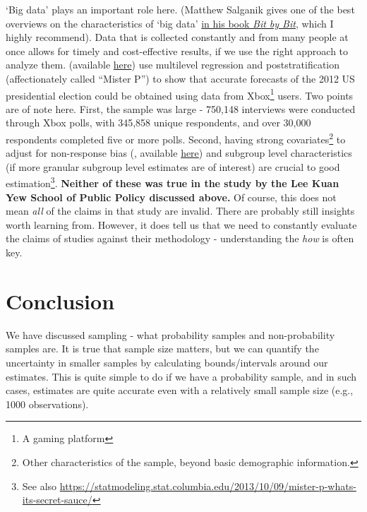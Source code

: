 \documentclass[openany]{book}
\let\rmarkdownfootnote\footnote%
\def\footnote{\protect\rmarkdownfootnote}
\begin{document}
`Big data' plays an important role here. (Matthew Salganik gives one of
the best overviews on the characteristics of `big data'
\href{https://www.bitbybitbook.com/en/1st-ed/observing-behavior/characteristics/}{in
his book \emph{Bit by Bit}}, which I highly recommend). Data that is
collected constantly and from many people at once allows for timely and
cost-effective results, if we use the right approach to analyze them.
\citet{wang_forecasting_2015} (available
\href{http://www.stat.columbia.edu/~gelman/research/published/forecasting-with-nonrepresentative-polls.pdf}{here})
use multilevel regression and poststratification (affectionately called
``Mister P'') to show that accurate forecasts of the 2012 US
presidential election could be obtained using data from Xbox\footnote{A
  gaming platform} users. Two points are of note here. First, the sample
was large - 750,148 interviews were conducted through Xbox polls, with
345,858 unique respondents, and over 30,000 respondents completed five
or more polls. Second, having strong covariates\footnote{Other
  characteristics of the sample, beyond basic demographic information.}
to adjust for non-response bias (\citet{gelman_mythical_2016}, available
\href{http://www.stat.columbia.edu/~gelman/research/published/swingers.pdf}{here})
and subgroup level characteristics (if more granular subgroup level
estimates are of interest) are crucial to good estimation\footnote{See
  also
  \url{https://statmodeling.stat.columbia.edu/2013/10/09/mister-p-whats-its-secret-sauce/}}.
\textbf{Neither of these was true in the study by the Lee Kuan Yew
School of Public Policy discussed above.} Of course, this does not mean
\emph{all} of the claims in that study are invalid. There are probably
still insights worth learning from. However, it does tell us that we
need to constantly evaluate the claims of studies against their
methodology - understanding the \emph{how} is often key.

\section{Conclusion}\label{conclusion-2}

We have discussed sampling - what probability samples and
non-probability samples are. It is true that sample size matters, but we
can quantify the uncertainty in smaller samples by calculating
bounds/intervals around our estimates. This is quite simple to do if we
have a probability sample, and in such cases, estimates are quite
accurate even with a relatively small sample size (e.g., 1000
observations).
\end{document}
